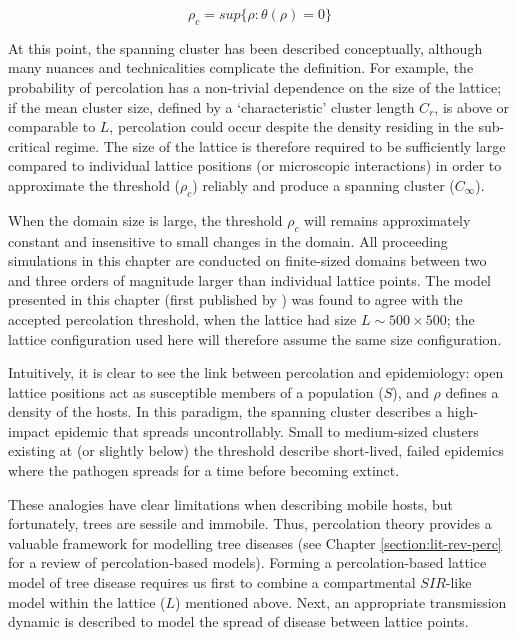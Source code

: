 \begin{equation}
\label{eq:critical_threshold_1d}
    \rho _{c}=sup \lbrace \rho : \theta (\rho ) = 0 \rbrace
\end{equation}

At this point, the spanning cluster has been described conceptually, although many nuances and technicalities complicate the definition. %
For example, the probability of percolation has a non-trivial dependence on the size of the lattice;
if the mean cluster size, defined by a `characteristic' cluster length $C_r$, is above or comparable to $L$, 
percolation could occur despite the density residing in the sub-critical regime. %
The size of the lattice is therefore required to be sufficiently large compared to individual lattice positions (or microscopic interactions) 
in order to approximate the threshold ($\rho_c$) reliably and produce a spanning cluster ($C_{\infty}$). 

When the domain size is large, the threshold $\rho_c$ will remains approximately constant and insensitive to small changes in the domain. 
All proceeding simulations in this chapter are conducted on finite-sized domains between two and three orders of magnitude larger than individual lattice points.
The model presented in this chapter (first published by \cite{OROZCOFUENTES201912}) was 
found to agree with the accepted percolation threshold, when the lattice had size $L \sim 500\times500$;
the lattice configuration used here will therefore assume the same size configuration. 

Intuitively, it is clear to see the link between percolation and epidemiology: 
open lattice positions act as susceptible members of a population ($S$), and $\rho$ defines a density of the hosts. 
In this paradigm, the spanning cluster describes a high-impact epidemic that spreads uncontrollably. 
Small to medium-sized clusters existing at (or slightly below) the threshold describe short-lived, 
failed epidemics where the pathogen spreads for a time before becoming extinct.

These analogies have clear limitations when describing mobile hosts, but fortunately, trees are sessile and immobile.
Thus, percolation theory provides a valuable framework for modelling tree diseases (see Chapter \ref{section:lit-rev-perc} 
for a review of percolation-based models). 
Forming a percolation-based lattice model of tree disease requires us first to combine a compartmental $SIR$-like model within the lattice ($L$) mentioned above. %
Next, an appropriate transmission dynamic is described to model the spread of disease between lattice points.


